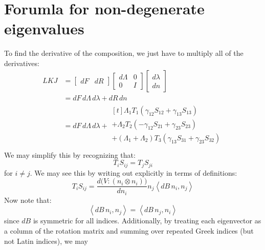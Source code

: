 \documentclass[reqno]{article}
\begin{document}
  \section{Forumla for non-degenerate eigenvalues}
  To find the derivative of the composition, we just have to multiply all of the
  derivatives:
  \begin{equation}
  \begin{split}
    LKJ
    &=
    \begin{bmatrix}
      dF & dR
    \end{bmatrix}
    \begin{bmatrix}
      d\Lambda & 0 \\
      0 & I
    \end{bmatrix}
    \begin{bmatrix}
      d\lambda \\
      dn
    \end{bmatrix} \\
    &=
    dF \, d\Lambda \, d\lambda
    + dR \, dn \\
    &=
    dF \, d\Lambda \, d\lambda
    +
    \begin{multlined}[t]
      \Lambda_1 T_1 \left( \gamma_{12} S_{12} + \gamma_{13} S_{13} \right) \\
      + \Lambda_2 T_2 \left( -\gamma_{12} S_{21} + \gamma_{23} S_{23} \right) \\
      + (\Lambda_1 + \Lambda_2) T_3 \left( \gamma_{13} S_{31} + \gamma_{23} S_{32} \right) \\
    \end{multlined}
  \end{split}
  \end{equation}
  We may simplify this by recognizing that:
  \begin{equation}
    T_i S_{ij} = T_j S_{ji}
  \end{equation}
  for $i \neq j$.
  We may see this by writing out explicitly in terms of definitions:
  \begin{equation}
    T_i S_{ij}
    =
    \frac{d \bigl( V : (n_i \otimes n_i) \bigr)}{d n_i}
    n_j \left< dB \, n_i, n_j \right>
  \end{equation}
  Now note that:
  \begin{equation}
    \left< dB \, n_i, n_j \right>
    =
    \left< dB \, n_j, n_i \right>
  \end{equation}
  since $dB$ is symmetric for all indices.
  Additionally, by treating each eigenvector as a column of the rotation matrix
  and summing over repeated Greek indices (but not Latin indices), we may
\end{document}
